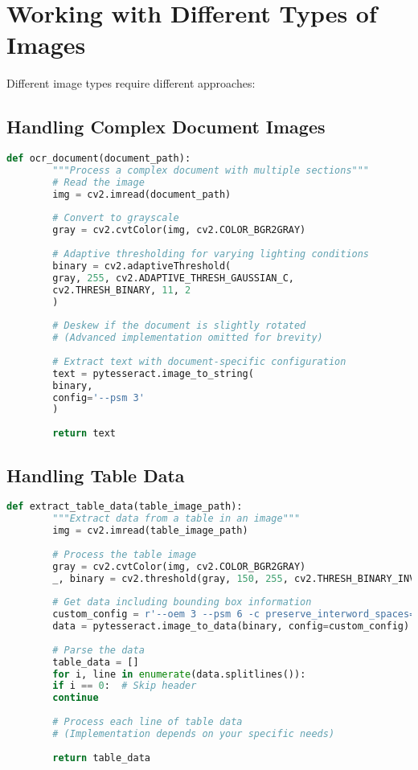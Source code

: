\documentclass{book}
\begin{document}
	\section{Working with Different Types of Images}
	Different image types require different approaches:
	
	\subsection{Handling Complex Document Images}
	\begin{lstlisting}[language=Python]
		def ocr_document(document_path):
		"""Process a complex document with multiple sections"""
		# Read the image
		img = cv2.imread(document_path)
		
		# Convert to grayscale
		gray = cv2.cvtColor(img, cv2.COLOR_BGR2GRAY)
		
		# Adaptive thresholding for varying lighting conditions
		binary = cv2.adaptiveThreshold(
		gray, 255, cv2.ADAPTIVE_THRESH_GAUSSIAN_C, 
		cv2.THRESH_BINARY, 11, 2
		)
		
		# Deskew if the document is slightly rotated
		# (Advanced implementation omitted for brevity)
		
		# Extract text with document-specific configuration
		text = pytesseract.image_to_string(
		binary, 
		config='--psm 3'
		)
		
		return text
	\end{lstlisting}
	
	\subsection{Handling Table Data}
	\begin{lstlisting}[language=Python]
		def extract_table_data(table_image_path):
		"""Extract data from a table in an image"""
		img = cv2.imread(table_image_path)
		
		# Process the table image
		gray = cv2.cvtColor(img, cv2.COLOR_BGR2GRAY)
		_, binary = cv2.threshold(gray, 150, 255, cv2.THRESH_BINARY_INV)
		
		# Get data including bounding box information
		custom_config = r'--oem 3 --psm 6 -c preserve_interword_spaces=1'
		data = pytesseract.image_to_data(binary, config=custom_config)
		
		# Parse the data
		table_data = []
		for i, line in enumerate(data.splitlines()):
		if i == 0:  # Skip header
		continue
		
		# Process each line of table data
		# (Implementation depends on your specific needs)
		
		return table_data
	\end{lstlisting}
	
\end{document}
